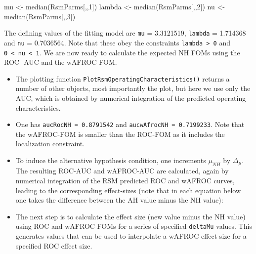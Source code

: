 \documentclass[
]{book}
\newenvironment{Shaded}{\begin{snugshade}}{\end{snugshade}}
\newcommand{\AttributeTok}[1]{\textcolor[rgb]{0.77,0.63,0.00}{#1}}
\newcommand{\DecValTok}[1]{\textcolor[rgb]{0.00,0.00,0.81}{#1}}
\newcommand{\FunctionTok}[1]{\textcolor[rgb]{0.00,0.00,0.00}{#1}}
\newcommand{\NormalTok}[1]{#1}
\newcommand{\OtherTok}[1]{\textcolor[rgb]{0.56,0.35,0.01}{#1}}
\newcommand{\SpecialCharTok}[1]{\textcolor[rgb]{0.00,0.00,0.00}{#1}}
\newcommand{\StringTok}[1]{\textcolor[rgb]{0.31,0.60,0.02}{#1}}
\begin{document}
\begin{Shaded}
\begin{Highlighting}[]
\NormalTok{mu }\OtherTok{\textless{}{-}} \FunctionTok{median}\NormalTok{(RsmParms[,,}\DecValTok{1}\NormalTok{]) }
\NormalTok{lambda }\OtherTok{\textless{}{-}} \FunctionTok{median}\NormalTok{(RsmParms[,,}\DecValTok{2}\NormalTok{])}
\NormalTok{nu }\OtherTok{\textless{}{-}} \FunctionTok{median}\NormalTok{(RsmParms[,,}\DecValTok{3}\NormalTok{])}
\end{Highlighting}
\end{Shaded}

The defining values of the fitting model are \texttt{mu} = 3.3121519, \texttt{lambda} = 1.714368 and \texttt{nu} = 0.7036564. Note that these obey the constraints \texttt{lambda\ \textgreater{}\ 0} and \texttt{0\ \textless{}\ nu\ \textless{}\ 1}. We are now ready to calculate the expected NH FOMs using the ROC -AUC and the wAFROC FOM.

\begin{Shaded}
\end{Shaded}

\begin{itemize}
\item
  The plotting function \texttt{PlotRsmOperatingCharacteristics()} returns a number of other objects, most importantly the plot, but here we use only the AUC, which is obtained by numerical integration of the predicted operating characteristics.
\item
  One has \texttt{aucRocNH\ =\ 0.8791542} and \texttt{aucwAfrocNH\ =\ 0.7199233}. Note that the wAFROC-FOM is smaller than the ROC-FOM as it includes the localization constraint.
\item
  To induce the alternative hypothesis condition, one increments \(\mu_{NH}\) by \(\Delta_{\mu}\). The resulting ROC-AUC and wAFROC-AUC are calculated, again by numerical integration of the RSM predicted ROC and wAFROC curves, leading to the corresponding effect-sizes (note that in each equation below one takes the difference between the AH value minus the NH value):
\item
  The next step is to calculate the effect size (new value minus the NH value) using ROC and wAFROC FOMs for a series of specified \texttt{deltaMu} values. This generates values that can be used to interpolate a wAFROC effect size for a specified ROC effect size.
\end{itemize}
\end{document}

